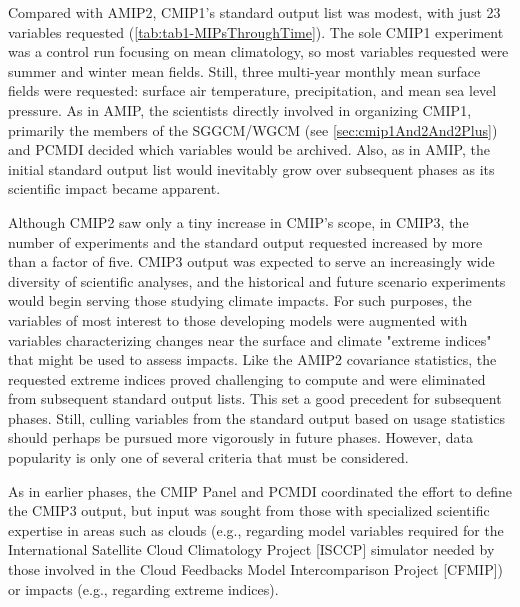 \documentclass[gmd, preprint]{copernicus}
\begin{document}
Compared with AMIP2, CMIP1's standard output list was modest, with just 23 variables requested (\autoref{tab:tab1-MIPsThroughTime}). The sole CMIP1 experiment was a control run focusing on mean climatology, so most variables requested were summer and winter mean fields. Still, three multi-year monthly mean surface fields were requested: surface air temperature, precipitation, and mean sea level pressure. As in AMIP, the scientists directly involved in organizing CMIP1, primarily the members of the SGGCM/WGCM (see \autoref{sec:cmip1And2And2Plus}) and PCMDI decided which variables would be archived. Also, as in AMIP, the initial standard output list would inevitably grow over subsequent phases as its scientific impact became apparent.

Although CMIP2 saw only a tiny increase in CMIP's scope, in CMIP3, the number of experiments and the standard output requested increased by more than a factor of five. CMIP3 output was expected to serve an increasingly wide diversity of scientific analyses, and the historical and future scenario experiments would begin serving those studying climate impacts. For such purposes, the variables of most interest to those developing models were augmented with variables characterizing changes near the surface and climate "extreme indices" that might be used to assess impacts. Like the AMIP2 covariance statistics, the requested extreme indices proved challenging to compute and were eliminated from subsequent standard output lists. This set a good precedent for subsequent phases. Still, culling variables from the standard output based on usage statistics should perhaps be pursued more vigorously in future phases. However, data popularity is only one of several criteria that must be considered. 

As in earlier phases, the CMIP Panel and PCMDI coordinated the effort to define the CMIP3 output, but input was sought from those with specialized scientific expertise in areas such as clouds (e.g., regarding model variables required for the International Satellite Cloud Climatology Project [ISCCP] simulator needed by those involved in the Cloud Feedbacks Model Intercomparison Project [CFMIP]) or impacts (e.g., regarding extreme indices).
\end{document}
